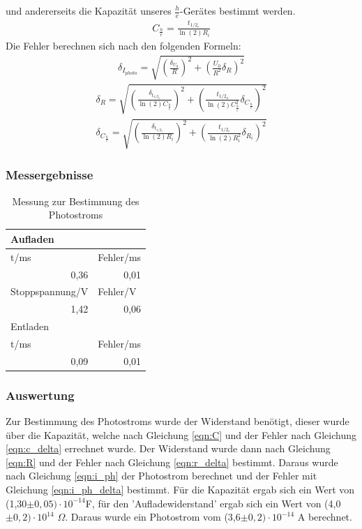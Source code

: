 \documentclass[12px]{scrartcl}
\begin{document}
und andererseits die Kapazität unseres $\frac{h}{e}$-Gerätes bestimmt werden.
\begin{align}
C_{\frac{h}{e}} = \frac{t_{1/2_e}}{\ln(2)R_i}
\label{eqn:C}
\end{align}
Die Fehler berechnen sich nach den folgenden Formeln:
\begin{align}
\delta_{I_{photo}}= \sqrt{
\left(\frac{\delta_{U_0}}{R}\right)^2+
\left(\frac{U_0}{R^2}\delta_R\right)^2}
\label{eqn:i_ph_delta}
\end{align}
\begin{align}
\delta_{R}= \sqrt{
\left(\frac{\delta_{t_{1/2_a}}}{\ln(2)C_{\frac{h}{e}}}\right)^2+
\left(\frac{t_{1/2_a}}{\ln(2)C_{\frac{h}{e}}^2}\delta_{C_{\frac{h}{e}}}\right)^2}
\label{eqn:r_delta}
\end{align}
\begin{align}
\delta_{C_{\frac{h}{e}}}= \sqrt{
\left(\frac{\delta_{t_{1/2_e}}}{\ln(2)R_i}\right)^2+
\left(\frac{t_{1/2_e}}{\ln(2)R_i^2}\delta_{R_i}\right)^2}
\label{eqn:c_delta}
\end{align}
\subsubsection{Messergebnisse}
\begin{table}[H]
\caption{Messung zur Bestimmung des Photostroms}
\begin{center}
\begin{tabular}{|l|l|}
\hline
Aufladen &  \\ \hline
t/ms & Fehler/ms \\ \hline
\multicolumn{1}{|r|}{0,36} & \multicolumn{1}{r|}{0,01} \\ \hline
Stoppspannung/V & Fehler/V \\ \hline
\multicolumn{1}{|r|}{1,42} & \multicolumn{1}{r|}{0,06} \\ \hline
Entladen &  \\ \hline
t/ms & Fehler/ms \\ \hline
\multicolumn{1}{|r|}{0,09} & \multicolumn{1}{r|}{0,01} \\ \hline
\end{tabular}
\end{center}
\label{tab:a_2.1}
\end{table}


\subsubsection{Auswertung}
Zur Bestimmung des Photostroms wurde der Widerstand benötigt, dieser wurde über die Kapazität, welche nach Gleichung \ref{eqn:C} und der Fehler nach Gleichung \ref{eqn:c_delta} errechnet wurde. Der Widerstand wurde dann nach Gleichung \ref{eqn:R} und der Fehler nach Gleichung \ref{eqn:r_delta} bestimmt. Daraus wurde nach Gleichung \ref{eqn:i_ph} der Photostrom berechnet und der Fehler mit Gleichung \ref{eqn:i_ph_delta} bestimmt. Für die Kapazität ergab sich ein Wert von (1,30$\pm 0,05)\cdot10^{-14}$F, für den 'Aufladewiderstand' ergab sich ein Wert von (4,0$\pm 0,2)\cdot10^{14}$ $\Omega$. Daraus wurde ein Photostrom vom (3,6$\pm 0,2)\cdot10^{-14}$ A berechnet.
\end{document}
